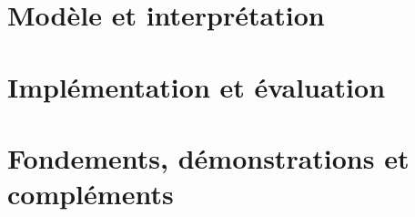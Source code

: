 \documentclass[11pt,a4paper,openany]{report}
\begin{document}
\setcounter{chapter}{0}
\renewcommand{\chaptername}{Chapitre}
\renewcommand{\thechapter}{\arabic{chapter}}
\renewcommand{\theHchapter}{cours.\arabic{chapter}}
\part{Modèle et interprétation}








\part{Implémentation et évaluation}




\appendix
\renewcommand{\theHchapter}{annexe.\arabic{chapter}}
\part{Fondements, démonstrations et compléments}













\cleardoublepage
{}
{}
\printbibliography[title={Références}]
\end{document}
